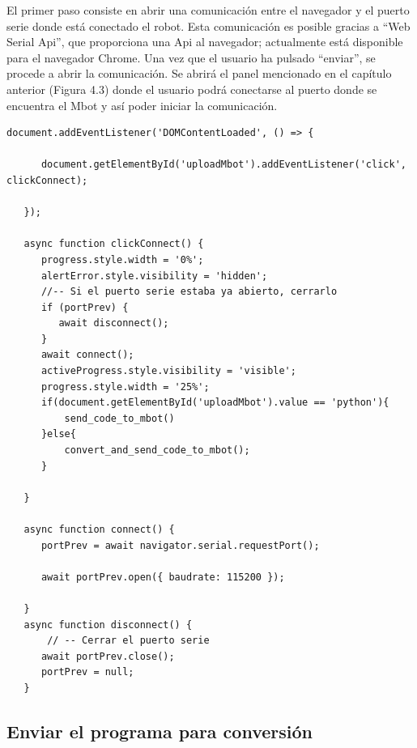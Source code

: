 \documentclass{report}
\begin{document}
El primer paso consiste en abrir una comunicación entre el navegador y el puerto serie donde está conectado el robot. Esta comunicación es posible gracias a “Web Serial Api”, que proporciona una Api al navegador; actualmente está disponible para el navegador Chrome.
Una vez que el usuario ha pulsado “enviar”, se procede a abrir la comunicación. Se abrirá el panel mencionado en el capítulo anterior (Figura 4.3) donde el usuario podrá conectarse al puerto donde se encuentra el Mbot y así poder iniciar la comunicación.
\\
\begin{lstlisting}[frame=single,breaklines=true, label=Abrir conexión con el Mbot por el puerto serie, caption=Abrir conexión con el Mbot por el puerto serie, captionpos=b]  % Inicia el bloque de código
   document.addEventListener('DOMContentLoaded', () => {

      document.getElementById('uploadMbot').addEventListener('click', clickConnect);

   });

   async function clickConnect() {
      progress.style.width = '0%';
      alertError.style.visibility = 'hidden';
      //-- Si el puerto serie estaba ya abierto, cerrarlo
      if (portPrev) {
         await disconnect();
      }
      await connect();
      activeProgress.style.visibility = 'visible';
      progress.style.width = '25%';
      if(document.getElementById('uploadMbot').value == 'python'){
          send_code_to_mbot()
      }else{
          convert_and_send_code_to_mbot();
      }

   }

   async function connect() {
      portPrev = await navigator.serial.requestPort();

      await portPrev.open({ baudrate: 115200 });

   }
   async function disconnect() {
       // -- Cerrar el puerto serie
      await portPrev.close();
      portPrev = null;
   }
\end{lstlisting}

\subsection{Enviar el programa para conversión}
\end{document}
